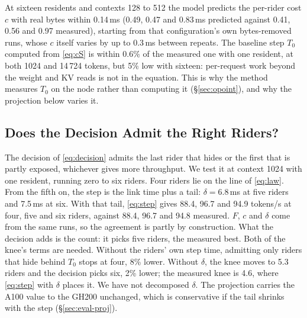 At sixteen residents and contexts 128 to 512 the model predicts the per-rider
cost $c$ with real bytes within 0.14\,ms (0.49, 0.47 and 0.83\,ms predicted
against 0.41, 0.56 and 0.97 measured), starting from that configuration's own
bytes-removed runs, whose $c$ itself varies by up to 0.3\,ms between repeats.
The baseline step $T_0$ computed from \cref{eq:cS} is within 0.6\% of the
measured one with one resident, at both 1024 and 14\,724 tokens, but 5\% low
with sixteen: per-request work beyond the weight and KV reads is not in the
equation. This is why the method measures $T_0$ on the node rather than
computing it (\S\ref{sec:opoint}), and why the projection below varies it.

\subsection{Does the Decision Admit the Right Riders?}\label{sec:eval-knee}

The decision of \cref{eq:decision} admits the last rider that hides or the
first that is partly exposed, whichever gives more throughput. We test it at
context 1024 with one resident, running zero to six riders. Four riders lie
on the line of \cref{eq:law}. From the fifth on, the step is the link time
plus a tail: $\delta = 6.8$\,ms at five riders and 7.5\,ms at six. With that
tail, \cref{eq:step} gives 88.4, 96.7 and 94.9 tokens/s at four, five and six
riders, against 88.4, 96.7 and 94.8 measured. $F$, $c$ and $\delta$ come from
the same runs, so the agreement is partly by construction. What the decision
adds is the count: it picks five riders, the measured best. Both of the knee's
terms are needed. Without the riders' own step time, admitting only riders
that hide behind $T_0$ stops at four, 8\% lower. Without $\delta$, the knee
moves to 5.3 riders and the decision picks six, 2\% lower; the measured knee
is 4.6, where \cref{eq:step} with $\delta$ places it. We have not decomposed $\delta$.
The projection carries the A100 value to the GH200 unchanged, which is
conservative if the tail shrinks with the step (\S\ref{sec:eval-proj}).


